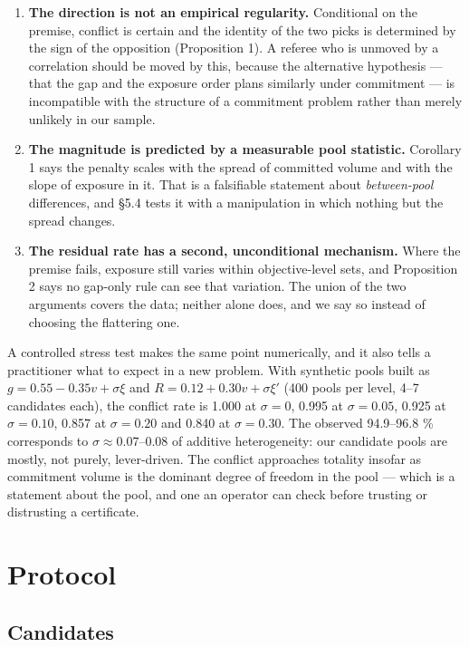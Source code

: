 \documentclass[preprint,12pt,letterpaper]{elsarticle}
\theoremstyle{definition}
\theoremstyle{plain}
\begin{document}
\begin{enumerate}
\item \textbf{The direction is not an empirical regularity.} Conditional on the premise, conflict is certain and the identity of the two picks is determined by the sign of the opposition (Proposition 1). A referee who is unmoved by a correlation should be moved by this, because the alternative hypothesis --- that the gap and the exposure order plans similarly under commitment --- is incompatible with the structure of a commitment problem rather than merely unlikely in our sample.
\item \textbf{The magnitude is predicted by a measurable pool statistic.} Corollary 1 says the penalty scales with the spread of committed volume and with the slope of exposure in it. That is a falsifiable statement about \textit{between-pool} differences, and \S 5.4 tests it with a manipulation in which nothing but the spread changes.
\item \textbf{The residual rate has a second, unconditional mechanism.} Where the premise fails, exposure still varies within objective-level sets, and Proposition 2 says no gap-only rule can see that variation. The union of the two arguments covers the data; neither alone does, and we say so instead of choosing the flattering one.
\end{enumerate}

A controlled stress test makes the same point numerically, and it also tells a practitioner what to expect in a new problem. With synthetic pools built as $g = 0.55 - 0.35 v + \sigma \xi$ and $R = 0.12 + 0.30 v + \sigma \xi'$ (400 pools per level, 4--7 candidates each), the conflict rate is 1.000 at $\sigma = 0$, 0.995 at $\sigma = 0.05$, 0.925 at $\sigma = 0.10$, 0.857 at $\sigma = 0.20$ and 0.840 at $\sigma = 0.30$. The observed 94.9--96.8 \% corresponds to $\sigma \approx 0.07\text{--}0.08$ of additive heterogeneity: our candidate pools are mostly, not purely, lever-driven. The conflict approaches totality insofar as commitment volume is the dominant degree of freedom in the pool --- which is a statement about the pool, and one an operator can check before trusting or distrusting a certificate.

\section{Protocol}

\subsection{Candidates}
\end{document}
